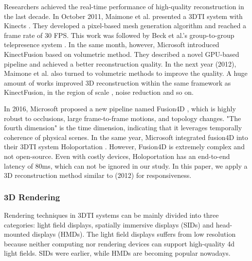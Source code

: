 Researchers achieved the real-time performance of high-quality reconstruction in the last decade. In October 2011, Maimone et al. presented a 3DTI system with Kinects \cite{maimone2011encumbrance}. They developed a pixel-based mesh generation algorithm and reached a frame rate of 30 FPS. This work was followed by Beck et al.'s group-to-group telepresence system \cite{beck2013immersive}. In the same month, however, Microsoft introduced KinectFusion \cite{izadi2011kinectfusion} based on volumetric method. They described a novel GPU-based pipeline and achieved a better reconstruction quality. In the next year (2012), Maimone et al. also turned to volumetric methods \cite{maimone2012real} to improve the quality. A huge amount of works improved 3D reconstruction within the same framework as KinectFusion, in the region of scale \cite{niessner2013real, chen2013scalable}, noise reduction \cite{khoshelham2012accuracy, nguyen2012modeling, newcombe2015dynamicfusion} and so on.

In 2016, Microsoft proposed a new pipeline named Fusion4D \cite{dou2016fusion4d}, which is highly robust to occlusions, large frame-to-frame motions, and topology changes. "The fourth dimension" is the time dimension, indicating that it leverages temporally coherence of physical scenes. In the same year, Microsoft integrated fusion4D into their 3DTI system Holoportation \cite{orts2016holoportation}. However, Fusion4D is extremely complex and not open-source. Even with costly devices, Holoportation has an end-to-end latency of 80ms, which can not be ignored in our study. In this paper, we apply a 3D reconstruction method similar to \cite{maimone2012real} (2012) for responsiveness.

\subsubsection{3D Rendering}

Rendering techniques in 3DTI systems can be mainly divided into three categories: light field displays, spatially immersive displays (SIDs) and head-mounted displays (HMDs). The light field displays \cite{jones2007rendering, jurik2011prototyping, kim2012telehuman, gotsch2018telehuman2} suffers from low resolution because neither computing nor rendering devices can support high-quality 4d light fields. SIDs were earlier, while HMDs are becoming popular nowadays.

